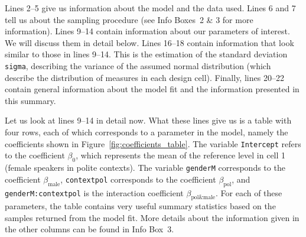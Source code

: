 \documentclass[nobib]{tufte-handout}
\begin{document}
Lines 2--5 give us information about the model and the data used. Lines 6 and 7 tell us about
the sampling procedure (see Info Boxes~2 \& 3 for more information). Lines 9--14 contain information about our
parameters of interest. We will discuss them in detail below. Lines 16--18 contain information
that look similar to those in lines 9--14. This is the estimation of the standard deviation
\texttt{sigma}, describing the variance of the assumed normal distribution (which describe the
distribution of measures in each design cell). Finally, lines 20--22 contain general
information about the model fit and the information presented in this summary.

Let us look at lines 9--14 in detail now. What these lines give us is a table with four rows, each of which corresponds to a parameter in the model, namely the coefficients shown in Figure~\ref{fig:coefficients_table}. The variable \texttt{Intercept} refers to the coefficient $\beta_0$, which represents the mean of the reference level in cell 1 (female speakers in polite contexts). The variable \texttt{genderM} corresponds to the coefficient $\beta_{\text{male}}$, \texttt{contextpol} corresponds to the coefficient $\beta_{\text{pol}}$, and \texttt{genderM:contextpol} is the interaction  coefficient $\beta_{\text{pol\&male}}$. For each of these parameters, the table contains very useful summary statistics based on the samples returned from the model fit.
%
%
More details about the information given in the other columns can be found in Info Box~3.
\end{document}
